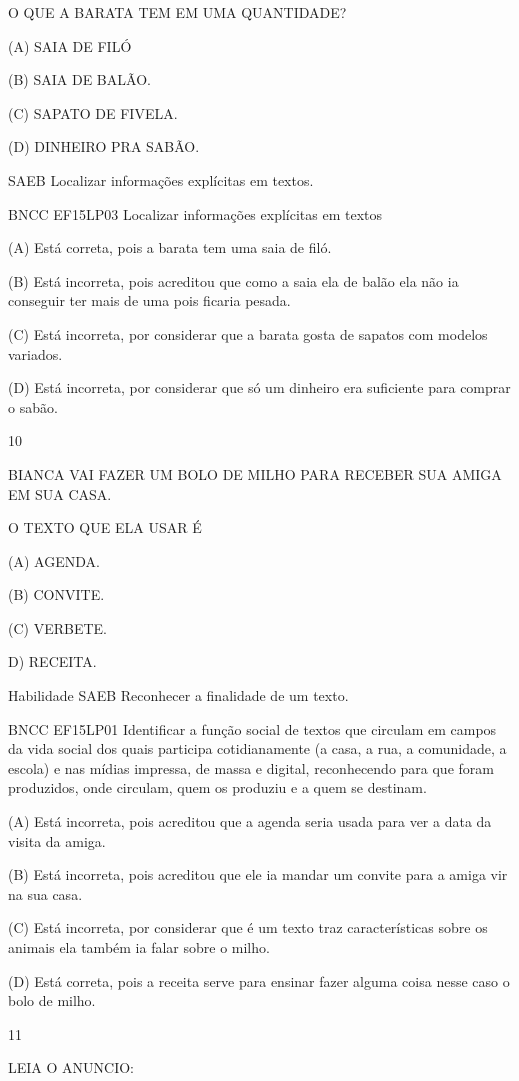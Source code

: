 {{{{{{O QUE A BARATA TEM EM UMA QUANTIDADE?

(A) SAIA DE FILÓ

(B) SAIA DE BALÃO.

(C) SAPATO DE FIVELA.

(D) DINHEIRO PRA SABÃO.

SAEB Localizar informações explícitas em textos.

BNCC EF15LP03 Localizar informações explícitas em textos

(A) Está correta, pois a barata tem uma saia de filó.

(B) Está incorreta, pois acreditou que como a saia ela de balão ela não
ia conseguir ter mais de uma pois ficaria pesada.

(C) Está incorreta, por considerar que a barata gosta de sapatos com
modelos variados.

(D) Está incorreta, por considerar que só um dinheiro era suficiente
para comprar o sabão.

\num{10}

BIANCA VAI FAZER UM BOLO DE MILHO PARA RECEBER SUA AMIGA EM SUA CASA.

O TEXTO QUE ELA USAR É

(A) AGENDA.

(B) CONVITE.

(C) VERBETE.

D) RECEITA.

Habilidade SAEB Reconhecer a finalidade de um texto.

BNCC EF15LP01 Identificar a função social de textos que circulam em
campos da vida social dos quais participa cotidianamente (a casa, a rua,
a comunidade, a escola) e nas mídias impressa, de massa e digital,
reconhecendo para que foram produzidos, onde circulam, quem os produziu
e a quem se destinam.

(A) Está incorreta, pois acreditou que a agenda seria usada para ver a
data da visita da amiga.

(B) Está incorreta, pois acreditou que ele ia mandar um convite para a
amiga vir na sua casa.

(C) Está incorreta, por considerar que é um texto traz características
sobre os animais ela também ia falar sobre o milho.

(D) Está correta, pois a receita serve para ensinar fazer alguma coisa
nesse caso o bolo de milho.

\num{11}

LEIA O ANUNCIO:

}}}}}}
